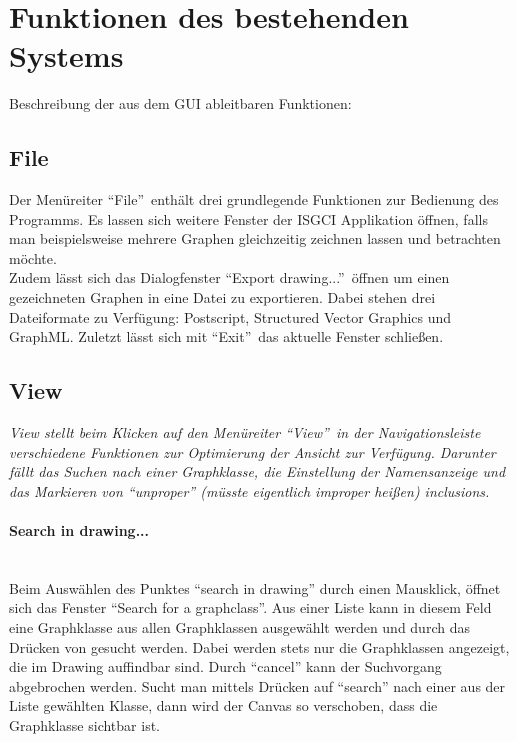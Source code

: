 \documentclass[10pt,a4paper]{article}
\newcommand{\G}[1]{\glqq\text{#1}\grqq} %
\begin{document}
\section{Funktionen des bestehenden Systems}
Beschreibung der aus dem GUI ableitbaren Funktionen:
\subsection{File}
Der Menüreiter "`File"'\ enthält drei grundlegende Funktionen zur Bedienung des Programms. Es lassen sich weitere Fenster der ISGCI Applikation öffnen, falls man beispielsweise mehrere Graphen gleichzeitig zeichnen lassen und betrachten möchte.\\
Zudem lässt sich das Dialogfenster "`Export drawing..."'\ öffnen um einen gezeichneten Graphen in eine Datei zu exportieren. Dabei stehen drei Dateiformate zu Verfügung: Postscript, Structured Vector Graphics und GraphML. Zuletzt lässt sich mit "`Exit"'\ das aktuelle Fenster schließen.\\

\subsection{View}
\emph{View stellt beim Klicken auf den Menüreiter "`View"'\ in der Navigationsleiste verschiedene Funktionen zur Optimierung der Ansicht zur Verfügung. Darunter fällt das Suchen nach einer Graphklasse, die Einstellung der Namensanzeige und das Markieren von "`unproper"' (müsste eigentlich improper heißen) inclusions.}\\

\paragraph{Search in drawing...}\ \\
Beim Auswählen des Punktes "`search in drawing"' durch einen Mausklick, öffnet sich das Fenster "`Search for a graphclass"'. Aus einer Liste kann in diesem Feld eine Graphklasse aus allen Graphklassen ausgewählt werden und durch das Drücken von \G{Search} gesucht werden. Dabei werden stets nur die Graphklassen angezeigt, die im Drawing auffindbar sind. Durch "`cancel"' kann der Suchvorgang abgebrochen werden. Sucht man mittels Drücken auf "`search"' nach einer aus der Liste gewählten Klasse, dann wird der Canvas so verschoben, dass die Graphklasse sichtbar ist.
\end{document}
